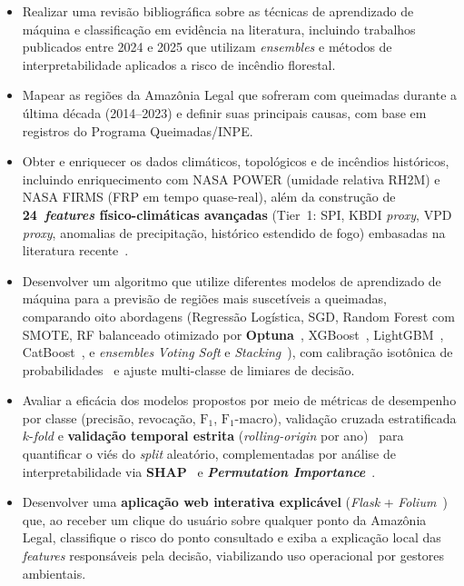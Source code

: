 \begin{itemize}
    \item[1.] Realizar uma revisão bibliográfica sobre as técnicas de aprendizado de máquina e classificação em evidência na literatura, incluindo trabalhos publicados entre 2024 e 2025 que utilizam \emph{ensembles} e métodos de interpretabilidade aplicados a risco de incêndio florestal.
    \item[2.] Mapear as regiões da Amazônia Legal que sofreram com queimadas durante a última década (2014--2023) e definir suas principais causas, com base em registros do Programa Queimadas/INPE.
    \item[3.] Obter e enriquecer os dados climáticos, topológicos e de incêndios históricos, incluindo enriquecimento com NASA POWER (umidade relativa RH2M) e NASA FIRMS (FRP em tempo quase-real), além da construção de \textbf{24~\emph{features} físico-climáticas avançadas} (Tier~1: SPI, KBDI \emph{proxy}, VPD \emph{proxy}, anomalias de precipitação, histórico estendido de fogo) embasadas na literatura recente~\cite{seager2015climatology,forests2024cerradoamazon,npjhazards2025fire}.
    \item[4.] Desenvolver um algoritmo que utilize diferentes modelos de aprendizado de máquina para a previsão de regiões mais suscetíveis a queimadas, comparando oito abordagens (Regressão Logística, SGD, Random Forest com SMOTE, RF balanceado otimizado por \textbf{Optuna}~\cite{akiba2019optuna}, XGBoost~\cite{chen2016xgboost}, LightGBM~\cite{ke2017lightgbm}, CatBoost~\cite{prokhorenkova2018catboost}, e \emph{ensembles} \emph{Voting Soft} e \emph{Stacking}~\cite{wolpert1992stacked}), com calibração isotônica de probabilidades~\cite{zadrozny2002transforming} e ajuste multi-classe de limiares de decisão.
    \item[5.] Avaliar a eficácia dos modelos propostos por meio de métricas de desempenho por classe (precisão, revocação, \(\text{F}_1\), \(\text{F}_1\)-macro), validação cruzada estratificada \(k\)-\emph{fold} e \textbf{validação temporal estrita} (\emph{rolling-origin} por ano)~\cite{bergmeir2012cv} para quantificar o viés do \emph{split} aleatório, complementadas por análise de interpretabilidade via \textbf{SHAP}~\cite{lundberg2017unified,lundberg2020local} e \textbf{\emph{Permutation Importance}}~\cite{breiman2001random,fisher2019all}.
    \item[6.] Desenvolver uma \textbf{aplicação web interativa explicável} (\emph{Flask} + \emph{Folium}~\cite{folium,leafletjs}) que, ao receber um clique do usuário sobre qualquer ponto da Amazônia Legal, classifique o risco do ponto consultado e exiba a explicação local das \emph{features} responsáveis pela decisão, viabilizando uso operacional por gestores ambientais.
\end{itemize}

